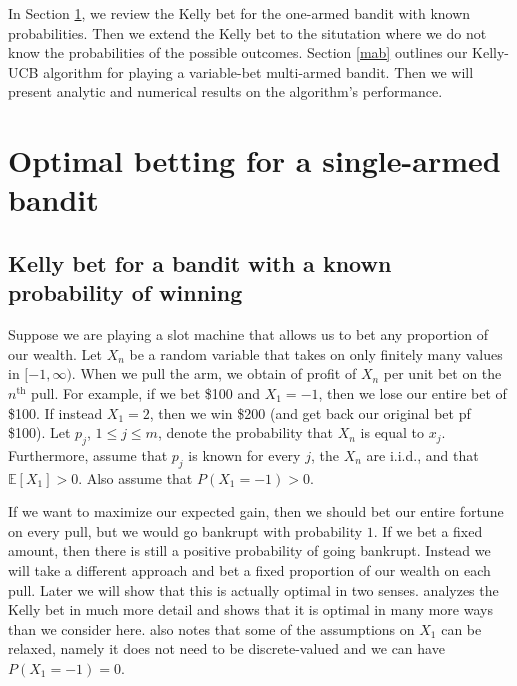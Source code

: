 \documentclass[letterpaper]{article}
\numberwithin{equation}{section}
\theoremstyle{plain}
\begin{document}
In Section \ref{singlearmed}, we review the Kelly bet for the one-armed bandit with known probabilities. Then we extend the Kelly bet to the situtation where we do not know the probabilities of the possible outcomes. Section \ref{mab} outlines our Kelly-UCB algorithm for playing a variable-bet multi-armed bandit. Then we will present analytic and numerical results on the algorithm's performance.

\section{Optimal betting for a single-armed bandit}\label{singlearmed}
\subsection{Kelly bet for a bandit with a known probability of winning}
Suppose we are playing a slot machine that allows us to bet any proportion of our wealth. Let $X_n$ be a random variable that takes on only finitely many values in $[-1,\infty)$.  When we pull the arm, we obtain of profit of $X_n$ per unit bet on the $n^\text{th}$ pull. For example, if we bet \$100 and $X_1 = -1$, then we lose our entire bet of \$100. If instead $X_1 = 2$, then we win \$200 (and get back our original bet pf \$100). Let $p_j$, $1\le j \le m$, denote the probability that $X_n$ is equal to $x_j$. Furthermore, assume that $p_j$ is known for every $j$, the $X_n$ are i.i.d., and that $\mathbb{E}[X_1] > 0$. Also assume that $P(X_1 = -1) > 0$.

If we want to maximize our expected gain, then we should bet our entire fortune on every pull, but we would go bankrupt with probability $1$. If we bet a fixed amount, then there is still a positive probability of going bankrupt. Instead we will take a different approach and bet a fixed proportion of our wealth on each pull. Later we will show that this is actually optimal in two senses. \cite{ethier2010doctrine} analyzes the Kelly bet in much more detail and shows that it is optimal in many more ways than we consider here. \cite{ethier2010doctrine} also notes that some of the assumptions on $X_1$ can be relaxed, namely it does not need to be discrete-valued and we can have $P(X_1 = -1) =0$.
\end{document}
